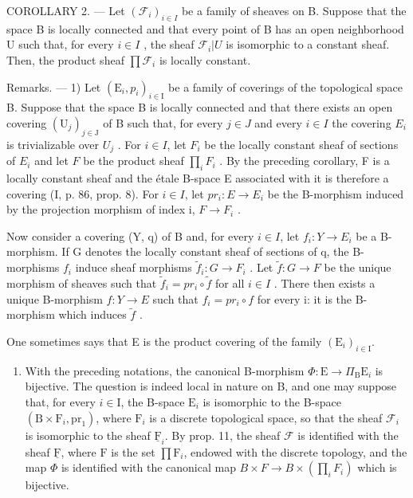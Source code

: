 COROLLARY 2. --- Let \((\mathcal{F}_{i})_{i\in I}\) be a family of sheaves on B. Suppose that the space B is locally connected and that every point of B has an open neighborhood U such that, for every \(i\in I\) , the sheaf \(\mathcal{F}_{i}|U\) is isomorphic to a constant sheaf. Then, the product sheaf \(\prod \mathcal{F}_{i}\) is locally constant.

Remarks. --- 1) Let \((\mathrm{E}_{i}, p_{i})_{i \in \mathrm{I}}\) be a family of coverings of the topological space B. Suppose that the space B is locally connected and that there exists an open covering \((\mathrm{U}_{j})_{j \in \mathrm{J}}\) of B such that, for every \(j \in J\) and every \(i \in I\) the covering \(E_{i}\) is trivializable over \(U_{j}\) . For \(i \in I\), let \(F_{i}\) be the locally constant sheaf of sections of \(E_{i}\) and let \(F\) be the product sheaf \(\prod_{i} F_{i}\) . By the preceding corollary, F is a locally constant sheaf and the étale B-space E associated with it is therefore a covering (I, p. 86, prop. 8). For \(i \in I\), let \(pr_{i}: E \to E_{i}\) be the B-morphism induced by the projection morphism of index i, \(F \to F_{i}\) .

Now consider a covering (Y, q) of B and, for every \(i \in I\), let \(f_i \colon Y \to E_i\) be a B-morphism. If G denotes the locally constant sheaf of sections of q, the B-morphisms \(f_i\) induce sheaf morphisms \(\widetilde{f}_i \colon G \to F_i\) . Let \(\widetilde{f} \colon G \to F\) be the unique morphism of sheaves such that \(\widetilde{f}_i = pr_i \circ \widetilde{f}\) for all \(i \in I\) . There then exists a unique B-morphism \(f \colon Y \to E\) such that \(f_i = pr_i \circ f\) for every i: it is the B-morphism which induces \(\widetilde{f}\) .

One sometimes says that E is the product covering of the family \((\mathrm{E}_i)_{i\in \mathrm{I}}\).

\begin{enumerate}
\def\labelenumi{\arabic{enumi})}
\setcounter{enumi}{1}
\tightlist
\item
  With the preceding notations, the canonical B-morphism \(\Phi\colon\mathrm{E}\to\Pi_{\mathrm{B}}\mathrm{E}_{i}\) is bijective. The question is indeed local in nature on B, and one may suppose that, for every \(i\in\mathrm{I}\), the B-space \(\mathrm{E}_{i}\) is isomorphic to the B-space \((\mathrm{B}\times\mathrm{F}_{i},\mathrm{pr}_{1})\), where \(\mathrm{F}_{i}\) is a discrete topological space, so that the sheaf \(\mathcal{F}_{i}\) is isomorphic to the sheaf \(\underline{\mathrm{F}}_{i}\). By prop. 11, the sheaf \(\mathcal{F}\) is identified with the sheaf \(\underline{\mathrm{F}}\), where \(\mathrm{F}\) is the set \(\prod\mathrm{F}_{i}\), endowed with the discrete topology, and the map \(\Phi\) is identified with the canonical map \(B \times F \rightarrow B \times (\prod_{i} F_{i})\) which is bijective.
\end{enumerate}

